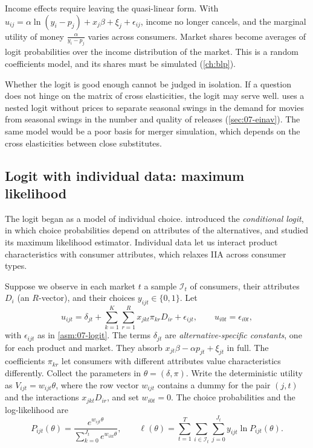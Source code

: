 Income effects require leaving the quasi-linear form. With $u_{ij} = \alpha\ln(y_i - p_j) + x_j\beta + \xi_j +
\epsilon_{ij}$, income no longer cancels, and the marginal utility of money $\frac{\alpha}{y_i - p_j}$ varies
across consumers. Market shares become averages of logit probabilities over the income distribution of the
market. This is a random coefficients model, and its shares must be simulated (\cref{ch:blp}).

\begin{remark}\label{rem:07-adequacy}
Whether the logit is good enough cannot be judged in isolation. If a question does not hinge on the matrix of
cross elasticities, the logit may serve well. \citet{Einav2007} uses a nested logit without prices to separate
seasonal swings in the demand for movies from seasonal swings in the number and quality of releases
(\cref{sec:07-einav}). The same model would be a poor basis for merger simulation, which depends on the
cross elasticities between close substitutes.
\end{remark}

\subsection{Logit with individual data: maximum likelihood}\label{sec:07-micro-ml}

The logit began as a model of individual choice. \citet{McFadden1974} introduced the \emph{conditional
logit}, in which choice probabilities depend on attributes of the alternatives, and studied its maximum
likelihood estimator. Individual data let us interact product characteristics with consumer attributes, which
relaxes IIA across consumer types.

Suppose we observe in each market $t$ a sample $\mathcal{I}_t$ of consumers, their attributes $D_i$ (an
$R$-vector), and their choices $y_{ijt} \in \{0, 1\}$. Let
\begin{equation}\label{eq:07-micro-utility}
  u_{ijt} = \delta_{jt} + \sum_{k=1}^{K}\sum_{r=1}^{R} x_{jkt}\pi_{kr}D_{ir} + \epsilon_{ijt}, \qquad
  u_{i0t} = \epsilon_{i0t},
\end{equation}
with $\epsilon_{ijt}$ as in \cref{asm:07-logit}. The terms $\delta_{jt}$ are \emph{alternative-specific
constants}, one for each product and market. They absorb $x_{jt}\beta - \alpha p_{jt} + \xi_{jt}$ in full. The
coefficients $\pi_{kr}$ let consumers with different attributes value characteristics differently. Collect the
parameters in $\theta = (\delta, \pi)$. Write the deterministic utility as $V_{ijt} = w_{ijt}\theta$, where the
row vector $w_{ijt}$ contains a dummy for the pair $(j, t)$ and the interactions $x_{jkt}D_{ir}$, and set
$w_{i0t} = 0$. The choice probabilities and the log-likelihood are
\begin{equation}\label{eq:07-micro-ll}
  P_{ijt}(\theta) = \frac{e^{w_{ijt}\theta}}{\sum_{k=0}^{J_t} e^{w_{ikt}\theta}}, \qquad
  \ell(\theta) = \sum_{t=1}^{T}\sum_{i \in \mathcal{I}_t}\sum_{j=0}^{J_t} y_{ijt}\ln P_{ijt}(\theta) .
\end{equation}

